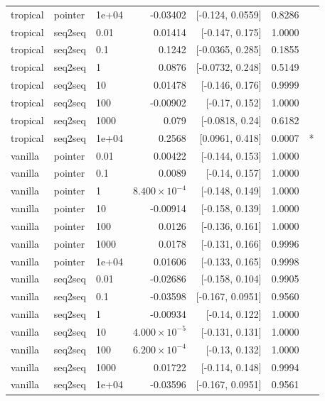 \documentclass[10pt]{article}
\begin{document}
{\begin{longtable}{lllrrrl}
tropical & pointer & 1e+04 & -0.03402 & [-0.124, 0.0559] & 0.8286 & \\
tropical & seq2seq & 0.01 & 0.01414 & [-0.147, 0.175] & 1.0000 & \\
tropical & seq2seq & 0.1 & 0.1242 & [-0.0365, 0.285] & 0.1855 & \\
tropical & seq2seq & 1 & 0.0876 & [-0.0732, 0.248] & 0.5149 & \\
tropical & seq2seq & 10 & 0.01478 & [-0.146, 0.176] & 0.9999 & \\
tropical & seq2seq & 100 & -0.00902 & [-0.17, 0.152] & 1.0000 & \\
tropical & seq2seq & 1000 & 0.079 & [-0.0818, 0.24] & 0.6182 & \\
tropical & seq2seq & 1e+04 & 0.2568 & [0.0961, 0.418] & 0.0007 & *\\
vanilla & pointer & 0.01 & 0.00422 & [-0.144, 0.153] & 1.0000 & \\
vanilla & pointer & 0.1 & 0.0089 & [-0.14, 0.157] & 1.0000 & \\
vanilla & pointer & 1 & $8.400\times10^{-4}$ & [-0.148, 0.149] & 1.0000 & \\
vanilla & pointer & 10 & -0.00914 & [-0.158, 0.139] & 1.0000 & \\
vanilla & pointer & 100 & 0.0126 & [-0.136, 0.161] & 1.0000 & \\
vanilla & pointer & 1000 & 0.0178 & [-0.131, 0.166] & 0.9996 & \\
vanilla & pointer & 1e+04 & 0.01606 & [-0.133, 0.165] & 0.9998 & \\
vanilla & seq2seq & 0.01 & -0.02686 & [-0.158, 0.104] & 0.9905 & \\
vanilla & seq2seq & 0.1 & -0.03598 & [-0.167, 0.0951] & 0.9560 & \\
vanilla & seq2seq & 1 & -0.00934 & [-0.14, 0.122] & 1.0000 & \\
vanilla & seq2seq & 10 & $4.000\times10^{-5}$ & [-0.131, 0.131] & 1.0000 & \\
vanilla & seq2seq & 100 & $6.200\times10^{-4}$ & [-0.13, 0.132] & 1.0000 & \\
vanilla & seq2seq & 1000 & 0.01722 & [-0.114, 0.148] & 0.9994 & \\
vanilla & seq2seq & 1e+04 & -0.03596 & [-0.167, 0.0951] & 0.9561 & \\
\bottomrule
\end{longtable}
}
\end{document}
